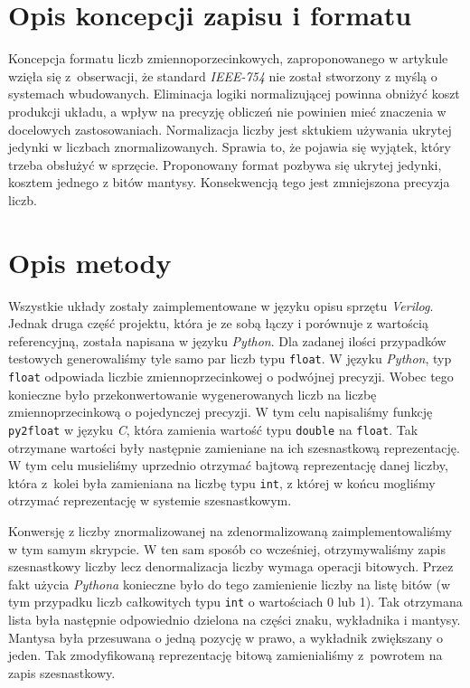 \documentclass{article}
\begin{document}
\section{Opis koncepcji zapisu i formatu}
Koncepcja formatu liczb zmiennoporzecinkowych, zaproponowanego w artykule \cite{art:old} wzięła się z~obserwacji, że standard \emph{IEEE-754} nie został stworzony z myślą o systemach wbudowanych.
Eliminacja logiki normalizującej powinna obniżyć koszt produkcji układu, a wpływ na precyzję obliczeń nie powinien mieć znaczenia w docelowych zastosowaniach.
Normalizacja liczby jest sktukiem używania ukrytej jedynki w liczbach znormalizowanych.
Sprawia to, że pojawia się wyjątek, który trzeba obsłużyć w sprzęcie.
Proponowany format pozbywa się ukrytej jedynki, kosztem jednego z bitów mantysy.
Konsekwencją tego jest zmniejszona precyzja liczb.


\section{Opis metody}
Wszystkie układy zostały zaimplementowane w języku opisu sprzętu \emph{Verilog}.
Jednak druga część projektu, która je ze sobą łączy i porównuje z wartością referencyjną, została napisana w języku \emph{Python}.
Dla zadanej ilości przypadków testowych generowaliśmy tyle samo par liczb typu \texttt{float}.
W języku \emph{Python}, typ \texttt{float} odpowiada liczbie zmiennoprzecinkowej o podwójnej precyzji.
Wobec tego konieczne było przekonwertowanie wygenerowanych liczb na liczbę zmiennoprzecinkową o pojedynczej precyzji.
W tym celu napisaliśmy funkcję \texttt{py2float} w języku \emph{C}, która zamienia wartość typu \texttt{double} na \texttt{float}.
Tak otrzymane wartości były następnie zamieniane na ich szesnastkową reprezentację.
W tym celu musieliśmy uprzednio otrzymać bajtową reprezentację danej liczby, która z~kolei była zamieniana na liczbę typu \texttt{int}, z której w końcu mogliśmy otrzymać reprezentację w systemie szesnastkowym.

Konwersję z liczby znormalizowanej na zdenormalizowaną zaimplementowaliśmy w tym samym skrypcie.
W ten sam sposób co wcześniej, otrzymywaliśmy zapis szesnastkowy liczby lecz denormalizacja liczby wymaga operacji bitowych.
Przez fakt użycia \emph{Pythona} konieczne było do tego zamienienie liczby na listę bitów (w tym przypadku liczb całkowitych typu \texttt{int} o wartościach 0 lub 1).
Tak otrzymana lista była następnie odpowiednio dzielona na części znaku, wykładnika i mantysy.
Mantysa była przesuwana o jedną pozycję w prawo, a wykładnik zwiększany o jeden.
Tak zmodyfikowaną reprezentację bitową zamienialiśmy z~powrotem na zapis szesnastkowy.
\end{document}
